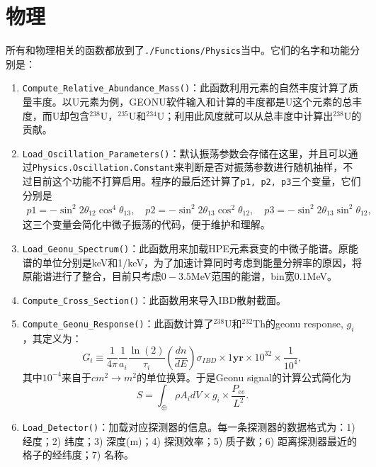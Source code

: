 		\section{物理}
			所有和物理相关的函数都放到了\texttt{./Functions/Physics}当中。它们的名字和功能分别是：
				\begin{enumerate}
					\item \texttt{Compute\_Relative\_Abundance\_Mass()}：此函数利用元素的自然丰度计算了质量丰度。以U元素为例，GEONU软件输入和计算的丰度都是U这个元素的总丰度，而U却包含${}^{238}$U，${}^{235}$U和${}^{234}$U；利用此风度就可以从总丰度中计算出${}^{238}$U的贡献。
					\item \texttt{Load\_Oscillation\_Parameters()}：默认振荡参数会存储在这里，并且可以通过\texttt{Physics.Oscillation.Constant}来判断是否对振荡参数进行随机抽样，不过目前这个功能不打算启用。程序的最后还计算了\texttt{p1, p2, p3}三个变量，它们分别是
						\begin{align}
							 p1 = -\sin^2 2\theta_{12} \cos^4 \theta_{13},
							 \quad
							 p2 = -\sin^2 2\theta_{13} \cos^2 \theta_{12},
							 \quad
							 p3 = - \sin^2 2\theta_{13} \sin^2 \theta_{12},
						\end{align}
					这三个变量会简化中微子振荡的代码，便于维护和理解。
					\item \texttt{Load\_Geonu\_Spectrum()}：此函数用来加载HPE元素衰变的中微子能谱。原能谱的单位分别是keV和1/keV，为了加速计算同时考虑到能量分辨率的原因，将原能谱进行了整合，目前只考虑$0-3.5$MeV范围的能谱，bin宽$0.1$MeV。
					\item \texttt{Compute\_Cross\_Section()}：此函数用来导入IBD散射截面。
					\item \texttt{Compute\_Geonu\_Response()}：此函数计算了${}^{238}$U和${}^{232}$Th的geonu response, $g_i$，其定义为：
						\begin{equation}
							G_i
							\equiv \frac{1}{4\pi}\frac{1}{a_i} \frac{\ln(2)}{\tau_i} \left(\frac{dn}{dE}\right) \sigma_{IBD} \times 1 \textbf{yr} \times 10^{32} \times \frac{1}{10^4},
						\end{equation}
					其中$10^{-4}$来自于$cm^2\rightarrow m^2$的单位换算。于是Geonu signal的计算公式简化为
						\begin{equation}
							S
							= \int_{\oplus} \rho A_i dV \times g_i \times \frac{P_{ee}}{L^2}.
						\end{equation}
					\item \texttt{Load\_Detector()}：加载对应探测器的信息。每一条探测器的数据格式为：1) 经度；2) 纬度；3) 深度(m)；4) 探测效率；5) 质子数；6) 距离探测器最近的格子的经纬度；7) 名称。
				\end{enumerate}

